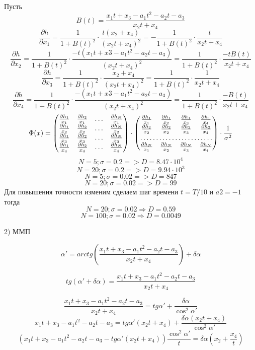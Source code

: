 \documentclass[a4paper,14pt]{article}
\theoremstyle{plain} %
\theoremstyle{definition} %
\theoremstyle{remark} %
\begin{document}
Пусть 
$$B(t)=\frac{x_1t+x_3-a_1t^2-a_2t-a_3}{ x_2t+x_4}$$
$$
\frac{\partial h}{\partial x_1}=\frac{1}{1+B(t)^2}\cdot\frac{t(x_2+x_4)}{(x_2t+x_4)^2}=-\frac{1}{1+B(t)^2}\cdot\frac{t}{x_2t+x_4}
$$
$$
\frac{\partial h}{\partial x_2}=\frac{1}{1+B(t)^2}\cdot\frac{-t(x_1t+x3-a_1t^2-a_2t-a_3)}{(x_2t+x_4)^2}=\frac{1}{1+B(t)^2}\cdot\frac{-tB(t)}{x_2t+x_4}
$$
$$
\frac{\partial h}{\partial x_3}=\frac{1}{1+B(t)^2}\cdot\frac{x_2+x_4}{(x_2t+x_4)^2}=\frac{1}{1+B(t)^2}\cdot\frac{1}{x_2t+x_4}
$$
$$
\frac{\partial h}{\partial x_4}=\frac{1}{1+B(t)^2}\cdot\frac{-(x_1t+x3-a_1t^2-a_2t-a_3)}{(x_2t+x_4)^2}=\frac{1}{1+B(t)^2}\cdot\frac{-B(t)}{x_2t+x_4}
$$
\[
\Phi(x)=
\begin{pmatrix}
    \frac{\partial h_1}{x_1} & \frac{\partial h_2}{x_1}  & \dots & \frac{\partial h_N}{x_1} \\
    \frac{\partial h_1}{x_2} & \frac{\partial h_2}{x_2}  & \dots & \frac{\partial h_N}{x_2} \\
    \frac{\partial h_1}{x_3} & \frac{\partial h_2}{x_3}  & \dots & \frac{\partial h_N}{x_3} \\
    \frac{\partial h_1}{x_4} & \frac{\partial h_2}{x_4}  & \dots & \frac{\partial h_N}{x_4} 
\end{pmatrix}
\cdot
\begin{pmatrix}
    \frac{\partial h_1}{x_1} & \frac{\partial h_1}{x_2}  & \frac{\partial h_1}{x_3} & \frac{\partial h_1}{x_4} \\
    \frac{\partial h_2}{x_2} & \frac{\partial h_2}{x_2}  & \frac{\partial h_2}{x_3} & \frac{\partial h_2}{x_4} \\
    \hdotsfor{4} \\
    \frac{\partial h_N}{x_1} & \frac{\partial h_N}{x_2}  & \frac{\partial h_N}{x_3} & \frac{\partial h_N}{x_4} 
\end{pmatrix}
\cdot \frac{1}{\sigma^2}
\]
$$N=5;\sigma=0.2 =>D=8.47\cdot10^4$$
$$N=20;\sigma=0.2 =>D=9.94\cdot10^3$$
$$N=5;\sigma=0.02 =>D=847$$
$$N=20;\sigma=0.02 =>D=99$$
Для повышения точности изменим сделаем шаг времени $t=T/10$ и  $a2=-1$ тогда
$$N=20;\sigma=0.02 \Rightarrow D=0.59$$
$$N=100;\sigma=0.02 \Rightarrow D=0.0049$$

2) ММП

$$\alpha'=arctg(\frac{x_1t+x_3-a_1t^2-a_2t-a_3}{x_2t+x_4})+\delta \alpha$$

$$tg(\alpha'+\delta \alpha)=\frac{x_1t+x_3-a_1t^2-a_2t-a_3}{ x_2t+x_4}$$


$$
\frac{x_1t+x_3-a_1t^2-a_2t-a_3}{ x_2t+x_4}=tg \alpha'+\frac{\delta \alpha}{\cos^2\alpha'}
$$
$$
x_1t+x_3-a_1t^2-a_2t-a_3=tg \alpha'(x_2t+x_4)+\frac{\delta \alpha(x_2t+x_4)}{\cos^2\alpha'}
$$
$$
( x_1t+x_3-a_1t^2-a_2t-a_3-tg\alpha'( x_2t+x_4))\frac{\cos^2\alpha'}{t}=\delta \alpha(x_2+\frac{x_4}{t})
$$
\end{document}
